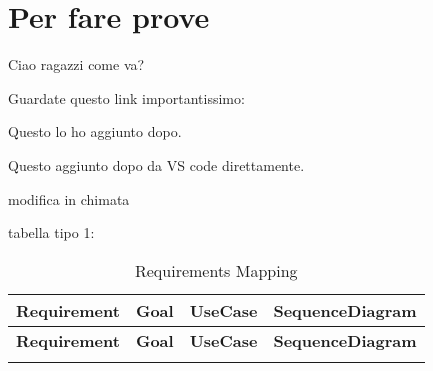 \chapter{Per fare prove}

Ciao ragazzi come va?

Guardate questo link importantissimo: \citep{provaBibliografia}


Questo lo ho aggiunto dopo.

Questo aggiunto dopo da VS code direttamente.


modifica in chimata



tabella tipo 1:

\begin{longtable}{cccc}
    \caption{Requirements Mapping} \\
    \toprule
    \textbf{Requirement} & \textbf{Goal} & \textbf{UseCase} & \textbf{SequenceDiagram} \\
    \midrule
    \endfirsthead
    
    \toprule
    \textbf{Requirement} & \textbf{Goal} & \textbf{UseCase} & \textbf{SequenceDiagram} \\
    \midrule
    \endhead
    
    \bottomrule
    \endfoot
    

\end{longtable}
